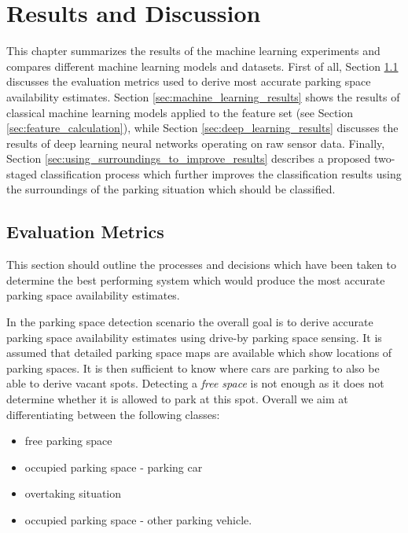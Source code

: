 \chapter{Results and Discussion}
\label{chap:evaluation}

This chapter summarizes the results of the machine learning experiments and compares different machine learning models and datasets. First of all, Section \ref{sec:optimization_goal} discusses the evaluation metrics used to derive most accurate parking space availability estimates. Section \ref{sec:machine_learning_results} shows the results of classical machine learning models applied to the feature set (see Section \ref{sec:feature_calculation}), while Section \ref{sec:deep_learning_results} discusses the results of deep learning neural networks operating on raw sensor data. Finally, Section \ref{sec:using_surroundings_to_improve_results} describes a proposed two-staged classification process which further improves the classification results using the surroundings of the parking situation which should be classified.






\section{Evaluation Metrics}
\label{sec:optimization_goal}

This section should outline the processes and decisions which have been taken to determine the best performing system which would produce the most accurate parking space availability estimates.

In the parking space detection scenario the overall goal is to derive accurate parking space availability estimates using drive-by parking space sensing. It is assumed that detailed parking space maps are available which show locations of parking spaces. It is then sufficient to know where cars are parking to also be able to derive vacant spots. Detecting a \emph{free space} is not enough as it does not determine whether it is allowed to park at this spot. Overall we aim at differentiating between the following classes:

\begin{itemize}
\setlength{\itemsep}{1pt}
\setlength{\parskip}{0pt}
\setlength{\parsep}{0pt}

\item free parking space
\item occupied parking space - parking car
\item overtaking situation
\item occupied parking space - other parking vehicle.

\end{itemize}

